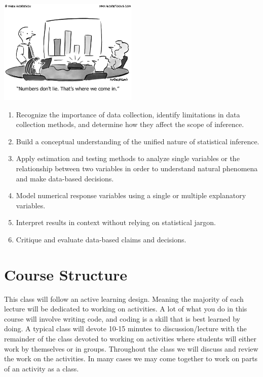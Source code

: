 \documentclass[
  letterpaper,
  DIV=11,
  numbers=noendperiod]{scrreprt}
\providecommand{\tightlist}{%
  \setlength{\itemsep}{0pt}\setlength{\parskip}{0pt}}\usepackage{longtable,booktabs,array}
\begin{document}
\includegraphics[width=0.5\textwidth,height=\textheight]{images/cartoon3308.png}

\begin{enumerate}
\def\labelenumi{\arabic{enumi}.}
\setcounter{enumi}{2}
\tightlist
\item
  Recognize the importance of data collection, identify limitations in
  data collection methods, and determine how they affect the scope of
  inference.
\item
  Build a conceptual understanding of the unified nature of statistical
  inference.
\item
  Apply estimation and testing methods to analyze single variables or
  the relationship between two variables in order to understand natural
  phenomena and make data-based decisions.
\item
  Model numerical response variables using a single or multiple
  explanatory variables.
\item
  Interpret results in context without relying on statistical jargon.
\item
  Critique and evaluate data-based claims and decisions.
\end{enumerate}

\hypertarget{course-structure}{%
\section*{Course Structure}\label{course-structure}}


This class will follow an active learning design. Meaning the majority
of each lecture will be dedicated to working on activities. A lot of
what you do in this course will involve writing code, and coding is a
skill that is best learned by doing. A typical class will devote 10-15
minutes to discussion/lecture with the remainder of the class devoted to
working on activities where students will either work by themselves or
in groups. Throughout the class we will discuss and review the work on
the activities. In many cases we may come together to work on parts of
an activity as a class.
\end{document}

